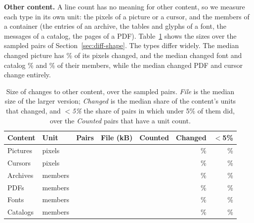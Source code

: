 \documentclass[sigconf,review]{acmart}
\begin{document}
\textbf{Other content.} A line count has no meaning for other content, so we measure each type
in its own unit: the pixels of a picture or a cursor, and the members of a container (the entries
of an archive, the tables and glyphs of a font, the messages of a catalog, the pages of a PDF).
Table~\ref{tab:content-size} shows the sizes over the \ContentSamplePairs{} sampled pairs of
Section~\ref{sec:diff-shape}. The types differ widely. The median changed picture has
\ContentSizePicturesSharePFiftyPct{}\% of its pixels changed, and the median changed font and
catalog \ContentSizeFontsSharePFiftyPct{}\% and \ContentSizeCatalogsSharePFiftyPct{}\% of their
members, while the median changed PDF and cursor change entirely.

\begin{table}
  \caption{Size of changes to other content, over the sampled pairs. \emph{File} is the median
  size of the larger version; \emph{Changed} is the median share of the content's units that
  changed, and \emph{$<$5\%} the share of pairs in which under 5\% of them did, over the
  \emph{Counted} pairs that have a unit count.}
  \label{tab:content-size}
  \small
  \begin{tabular}{@{}llrrrrr@{}}
    \toprule
    Content & Unit & Pairs & File (kB) & Counted & Changed & $<$5\% \\
    \midrule
    Pictures & pixels & \ContentSizePicturesPairs{} & \ContentSizePicturesKbPFifty{} & \ContentSizePicturesCounted{} & \ContentSizePicturesSharePFiftyPct{}\% & \ContentSizePicturesUnderFivePct{}\% \\
    Cursors & pixels & \ContentSizeCursorsPairs{} & \ContentSizeCursorsKbPFifty{} & \ContentSizeCursorsCounted{} & \ContentSizeCursorsSharePFiftyPct{}\% & \ContentSizeCursorsUnderFivePct{}\% \\
    Archives & members & \ContentSizeArchivesPairs{} & \ContentSizeArchivesKbPFifty{} & \ContentSizeArchivesCounted{} & \ContentSizeArchivesSharePFiftyPct{}\% & \ContentSizeArchivesUnderFivePct{}\% \\
    PDFs & members & \ContentSizePdfsPairs{} & \ContentSizePdfsKbPFifty{} & \ContentSizePdfsCounted{} & \ContentSizePdfsSharePFiftyPct{}\% & \ContentSizePdfsUnderFivePct{}\% \\
    Fonts & members & \ContentSizeFontsPairs{} & \ContentSizeFontsKbPFifty{} & \ContentSizeFontsCounted{} & \ContentSizeFontsSharePFiftyPct{}\% & \ContentSizeFontsUnderFivePct{}\% \\
    Catalogs & members & \ContentSizeCatalogsPairs{} & \ContentSizeCatalogsKbPFifty{} & \ContentSizeCatalogsCounted{} & \ContentSizeCatalogsSharePFiftyPct{}\% & \ContentSizeCatalogsUnderFivePct{}\% \\
    \bottomrule
  \end{tabular}
\end{table}
\end{document}
